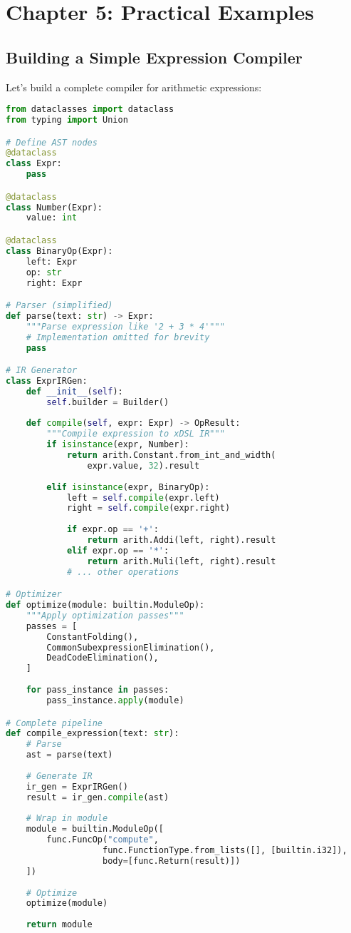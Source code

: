 \documentclass[11pt,a4paper]{article}
\begin{document}
\section{Chapter 5: Practical Examples}

\subsection{Building a Simple Expression Compiler}

Let's build a complete compiler for arithmetic expressions:

\begin{lstlisting}[language=Python, caption=Expression Compiler]
from dataclasses import dataclass
from typing import Union

# Define AST nodes
@dataclass
class Expr:
    pass

@dataclass
class Number(Expr):
    value: int

@dataclass  
class BinaryOp(Expr):
    left: Expr
    op: str
    right: Expr

# Parser (simplified)
def parse(text: str) -> Expr:
    """Parse expression like '2 + 3 * 4'"""
    # Implementation omitted for brevity
    pass

# IR Generator
class ExprIRGen:
    def __init__(self):
        self.builder = Builder()
        
    def compile(self, expr: Expr) -> OpResult:
        """Compile expression to xDSL IR"""
        if isinstance(expr, Number):
            return arith.Constant.from_int_and_width(
                expr.value, 32).result
        
        elif isinstance(expr, BinaryOp):
            left = self.compile(expr.left)
            right = self.compile(expr.right)
            
            if expr.op == '+':
                return arith.Addi(left, right).result
            elif expr.op == '*':
                return arith.Muli(left, right).result
            # ... other operations

# Optimizer
def optimize(module: builtin.ModuleOp):
    """Apply optimization passes"""
    passes = [
        ConstantFolding(),
        CommonSubexpressionElimination(),
        DeadCodeElimination(),
    ]
    
    for pass_instance in passes:
        pass_instance.apply(module)

# Complete pipeline
def compile_expression(text: str):
    # Parse
    ast = parse(text)
    
    # Generate IR
    ir_gen = ExprIRGen()
    result = ir_gen.compile(ast)
    
    # Wrap in module
    module = builtin.ModuleOp([
        func.FuncOp("compute", 
                   func.FunctionType.from_lists([], [builtin.i32]),
                   body=[func.Return(result)])
    ])
    
    # Optimize
    optimize(module)
    
    return module
\end{lstlisting}
\end{document}
